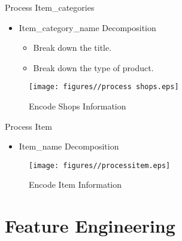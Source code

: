 \documentclass[
 size=14pt,
 paper=smartboard,  %
 mode=present, 		%
 display=slides, 	%
 style=tuliplab,  	%
 pauseslide,
 fleqn,leqno]{powerdot}
\begin{document}
\begin{slide}{Process Item\_categories}
\begin{itemize}
	\item
	Item\_category\_name Decomposition
	\begin{itemize}
		\item
		\smallskip
		Break down the title. 
		\item
		\smallskip
		Break down the type of product.
	\end{itemize}
\end{itemize}

\begin{figure}
	\centering
	\texttt{[image: figures//process shops.eps]}
	\caption{Encode Shops Information}\label{fig:timg}
\end{figure}
\end{slide}


\begin{slide}{Process Item}
	
	\begin{itemize}
		\item
		Item\_name Decomposition
	\end{itemize}
	
	\begin{figure}
		\centering
		\texttt{[image: figures//processitem.eps]}
		\caption{Encode Item Information}\label{fig:timg}
	\end{figure}
	
\end{slide}

\section{Feature Engineering}
\end{document}
